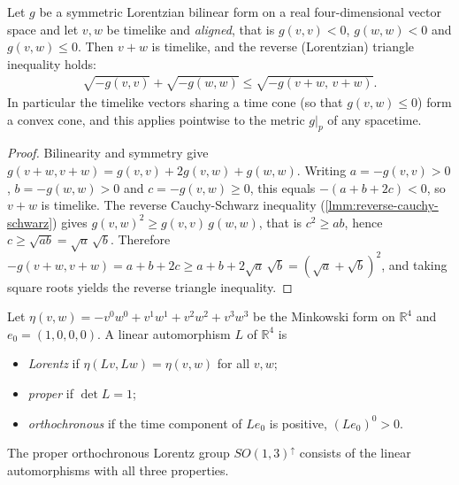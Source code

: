 \begin{lemma}
    \label{lmm:timelike-cone-convexity}
    \leanok
    Let $g$ be a symmetric Lorentzian bilinear form on a real four-dimensional vector space and let $v, w$ be timelike and \emph{aligned}, that is $g(v,v) < 0$, $g(w,w) < 0$ and $g(v,w) \le 0$. Then $v + w$ is timelike, and the reverse (Lorentzian) triangle inequality holds:
    \begin{align}
        \sqrt{-g(v,v)} + \sqrt{-g(w,w)} \le \sqrt{-g(v+w,\,v+w)}.
    \end{align}
    In particular the timelike vectors sharing a time cone (so that $g(v,w) \le 0$) form a convex cone, and this applies pointwise to the metric $g|_p$ of any spacetime.
\end{lemma}
\begin{proof}
    \leanok
    Bilinearity and symmetry give $g(v+w,v+w) = g(v,v) + 2g(v,w) + g(w,w)$. Writing $a = -g(v,v) > 0$, $b = -g(w,w) > 0$ and $c = -g(v,w) \ge 0$, this equals $-(a + b + 2c) < 0$, so $v+w$ is timelike. The reverse Cauchy-Schwarz inequality (\ref{lmm:reverse-cauchy-schwarz}) gives $g(v,w)^2 \ge g(v,v)\,g(w,w)$, that is $c^2 \ge ab$, hence $c \ge \sqrt{ab} = \sqrt a \,\sqrt b$. Therefore $-g(v+w,v+w) = a + b + 2c \ge a + b + 2\sqrt a\,\sqrt b = (\sqrt a + \sqrt b)^2$, and taking square roots yields the reverse triangle inequality.
\end{proof}

\begin{definition}
    \label{def:lorentz-transformation}
    \leanok
    Let $\eta(v,w) = -v^0 w^0 + v^1 w^1 + v^2 w^2 + v^3 w^3$ be the Minkowski form on $\mathbb{R}^4$ and $e_0 = (1,0,0,0)$. A linear automorphism $L$ of $\mathbb{R}^4$ is
    \begin{itemize}
        \item \textit{Lorentz} if $\eta(Lv, Lw) = \eta(v,w)$ for all $v, w$;
        \item \textit{proper} if $\det L = 1$;
        \item \textit{orthochronous} if the time component of $L e_0$ is positive, $(L e_0)^0 > 0$.
    \end{itemize}
    The proper orthochronous Lorentz group $SO(1,3)^{\uparrow}$ consists of the linear automorphisms with all three properties.
\end{definition}

